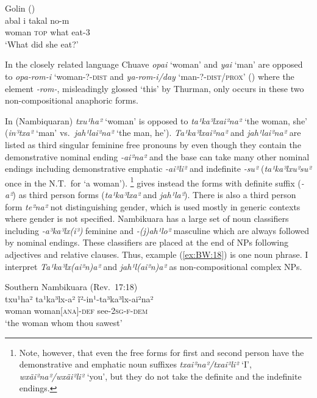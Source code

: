 \documentclass[output=collectionpaper]{langsci/langscibook}
\begin{document}
\ea\label{ex:BW:17}
Golin (\citealt[35]{Lee2005})\\
\gll abal 	i 	takal 	no-m \\
woman	\textsc{top} 	what 	eat-3\\
\glt ‘What did she eat?’\\
\z

In the closely related language Chuave \textit{opai} ‘woman’ and \textit{yai} ‘man’ are opposed to \textit{opa-rom-i} ‘woman-?-\textsc{dist} and \textit{ya-rom-i/day} ‘man-?-\textsc{dist/prox}’ (\citealt{Thurman1987}) where the element \textit{-rom-}, misleadingly glossed ‘this’ by Thurman, only occurs in these two non-compositional anaphoric forms.

In  (Nambiquaran) \textit{txu¹ha²} ‘woman’ is opposed to \textit{ta¹ka³lxai²na²} ‘the woman, she’ (\textit{in³txa²} ‘man’ vs.\ \textit{jah¹lai²na²} ‘the man, he’). \textit{Ta¹ka³lxai²na²} and \textit{jah¹lai²na²} are listed as third singular feminine free pronouns by \citet[283]{Lowe1999} even though they contain the demonstrative nominal ending \textit{-ai²na²} and the base can take many other nominal endings including demonstrative emphatic \mbox{\textit{-ai²li²}} and indefinite \textit{-su²} (\textit{ta¹ka³lxu²su²} once in the N.T.\ for ‘a woman’).%
\footnote{%
Note, however, that even the free forms for first and second person have the demonstrative and emphatic noun suffixes \textit{txai²na²/txai²li²} ‘I’, \textit{wxãi²na²/wxãi²li²} ‘you’, but they do not take the definite and the indefinite endings.
} %
\citet[71]{Kroeker2001} gives instead the forms with definite suffix (\textit{-a²}) as third person forms (\textit{ta¹ka³lxa²} and \textit{jah¹la²}). There is also a third person form \textit{te²na²} not distinguishing gender, which is used mostly in generic contexts where gender is not specified. Nambikuara has a large set of noun classifiers including \textit{-a³ka³lx(i³)} feminine and \textit{-(j)ah¹lo²} masculine which are always followed by nominal endings. These classifiers are placed at the end of NPs following adjectives and relative clauses. Thus, example (\ref{ex:BW:18}) is one noun phrase. I interpret \textit{Ta¹ka³lx(ai²n)a²} and \textit{jah¹l(ai²n)a²} as non-compositional complex NPs.

\ea\label{ex:BW:18}
Southern Nambikuara (Rev.~17:18)\\
\gll txu¹ha²	ta¹ka³lx-a²	ĩ²-in¹-ta³ka³lx-ai²na²	\\
woman	woman[\textsc{ana}]-\textsc{def}	see-\textsc{2sg-f-dem}\\
\glt ‘the woman whom thou sawest’\\
\z
\end{document}
